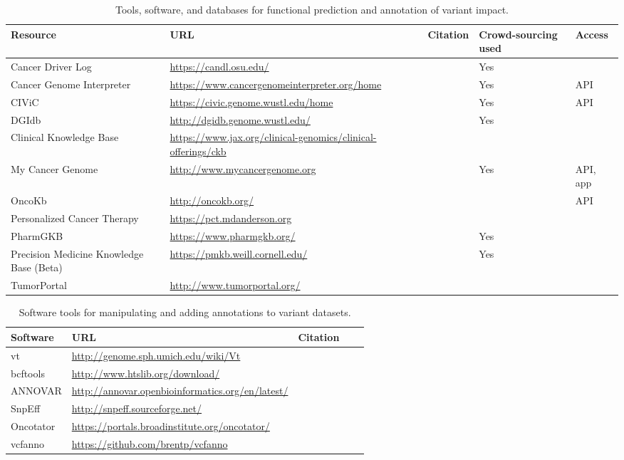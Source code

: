 \documentclass{article}
\begin{document}
\begin{table}[p]
\centering
\begin{tabularx}{\textwidth}{p{3cm}XXp{1.5cm}p{1.5cm}}
  \hline
  Resource & URL & Citation & Crowd-sourcing used & Access \\
  \hline
  Cancer Driver Log & \url{https://candl.osu.edu/} & \parencite{Damodaran2015-so} & Yes & \\
  Cancer Genome Interpreter & \url{https://www.cancergenomeinterpreter.org/home} & \parencite{Tamborero2017-ay} & Yes & API \\
  CIViC & \url{https://civic.genome.wustl.edu/home} & \parencite{Griffith2016-sy} & Yes & API \\
  DGIdb & \url{http://dgidb.genome.wustl.edu/} & \parencite{Wagner2016-fs,Griffith2013-uv} & Yes & \\
  Clinical Knowledge Base & \url{https://www.jax.org/clinical-genomics/clinical-offerings/ckb} & & & \\
  My Cancer Genome & \url{http://www.mycancergenome.org} & \parencite{Micheel2014-pz} & Yes & API, app \\
  OncoKb & \url{http://oncokb.org/} & \parencite{Chakravarty2017-gx} & & API \\
  Personalized Cancer Therapy & \url{https://pct.mdanderson.org} & & \\
  PharmGKB & \url{https://www.pharmgkb.org/} &  \parencite{Hewett2002-yu} & Yes & \\
  Precision Medicine Knowledge Base (Beta) & \url{https://pmkb.weill.cornell.edu/} & \parencite{Huang2016-zx} & Yes & \\
  TumorPortal & \url{http://www.tumorportal.org/} &
  \parencite{Lawrence2014-ss} & & \\
  \hline
\end{tabularx}
\caption{Tools, software, and databases for functional prediction and annotation of variant impact. }
\label{table:3}
\end{table}
 
 
\begin{table}[p]
\centering
\begin{tabularx}{\textwidth}{p{3cm}XXp{1.5cm}p{1.5cm}}
  \hline
  Software & URL & Citation \\
  \hline
  vt & \url{http://genome.sph.umich.edu/wiki/Vt} & \parencite{Tan2015-dv} \\
  bcftools & \url{http://www.htslib.org/download/} & \parencite{Li2009-du} \\
  ANNOVAR & \url{http://annovar.openbioinformatics.org/en/latest/} & \parencite{Wang2010-bt} \\
  SnpEff & \url{http://snpeff.sourceforge.net/} & \parencite{Cingolani2012-pt} \\
  Oncotator & \url{https://portals.broadinstitute.org/oncotator/} &
  \parencite{Ramos2015-vn} \\
  vcfanno & \url{https://github.com/brentp/vcfanno} &
  \parencite{Pedersen2016-pu} \\
  \hline
\end{tabularx}
\caption{Software tools for manipulating and adding annotations to variant datasets. }
\label{table:4}
\end{table}
\end{document}
